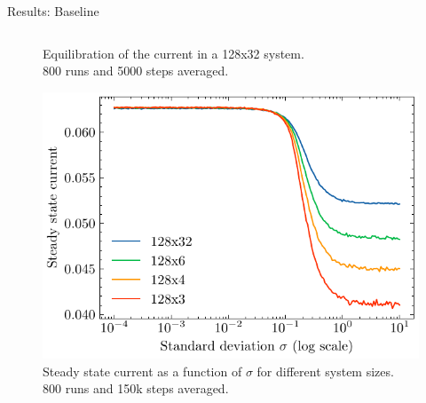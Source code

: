 \documentclass[10pt,xcolor=table, aspectratio=1610]{beamer}
\begin{document}
\begin{frame}{Results: Baseline}
\begin{columns}
\begin{overprint}
\begin{figure}
      \caption*{Equilibration of the current in a 128x32 system. \\ 800 runs and 5000 steps averaged.}
    \end{figure}
    \begin{figure}
      \includegraphics[width=\textwidth]{../Thesis/img/results/steady_state_current_sizes_log.pdf}
      \caption*{Steady state current as a function of $\sigma$ for different system sizes.\\800 runs and 150k steps averaged.}
    \end{figure}
    \end{overprint}
  \end{columns}
\end{frame}
\end{document}
